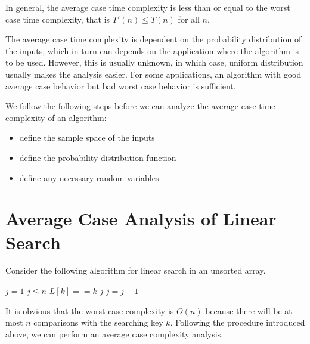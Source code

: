 In general, the average case time complexity is less than or equal to the worst case time complexity, that is $T'(n) \leq T(n)$ for all $n$.

The average case time complexity is dependent on the probability distribution of the inputs, which in turn can depends on the application where the algorithm is to be used. However, this is usually unknown, in which case, uniform distribution usually makes the analysis easier. For some applications, an algorithm with good average case behavior but bad worst case behavior is sufficient.

We follow the following steps before we can analyze the average case time complexity of an algorithm:

\begin{itemize}
    \item define the sample space of the inputs
    \item define the probability distribution function
    \item define any necessary random variables
\end{itemize}

\section{Average Case Analysis of Linear Search}

Consider the following algorithm for linear search in an unsorted array.

\begin{codebox}
    \li $j = 1$
    \li \While $j \leq n$ \Do
    \li \If $L[k] == k$
    \li \Then \Return $j$ \End
    \li $j = j + 1$ \End
    \li {} 
\end{codebox}

It is obvious that the worst case complexity is $O(n)$ because there will be at most $n$ comparisons with the searching key $k$. Following the procedure introduced above, we can perform an average case complexity analysis.

